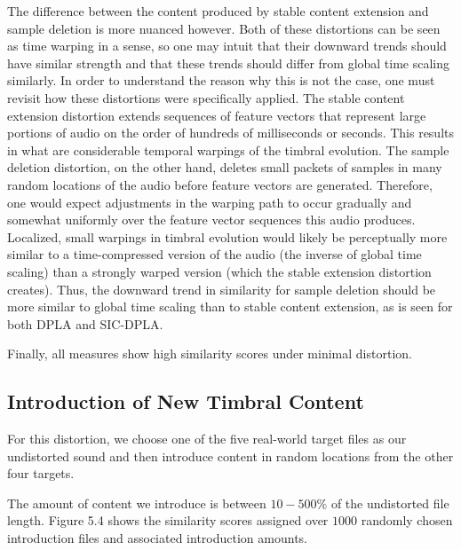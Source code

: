 \documentclass[a4paper,12pt]{report} 	%
\numberwithin{figure}{chapter}
\numberwithin{table}{chapter}
\numberwithin{equation}{chapter}
\begin{document}
\begin{flushleft}
The difference between the content produced by stable content extension and sample deletion is more nuanced however. Both of these distortions can be seen as time warping in a sense, so one may intuit that their downward trends should have similar strength and that these trends should differ from global time scaling similarly. In order to understand the reason why this is not the case, one must revisit how these distortions were specifically applied. The stable content extension distortion extends sequences of feature vectors that represent large portions of audio on the order of hundreds of milliseconds or seconds. This results in what are considerable temporal warpings of the timbral evolution. The sample deletion distortion, on the other hand, deletes small packets of samples in many random locations of the audio before feature vectors are generated. Therefore, one would expect adjustments in the warping path to occur gradually and somewhat uniformly over the feature vector sequences this audio produces. Localized, small warpings in timbral evolution would likely be perceptually more similar to a time-compressed version of the audio (the inverse of global time scaling) than a strongly warped version (which the stable extension distortion creates). Thus, the downward trend in similarity for sample deletion should be more similar to global time scaling than to stable content extension, as is seen for both DPLA and SIC-DPLA.

Finally, all measures show high similarity scores under minimal distortion.

\subsection{Introduction of New Timbral Content}
For this distortion, we choose one of the five real-world target files as our undistorted sound and then introduce content in random locations from the other four targets. 

The amount of content we introduce is between $10-500\%$ of the undistorted file length. Figure 5.4 shows the similarity scores assigned over $1000$ randomly chosen introduction files and associated introduction amounts.


\end{flushleft}
\end{document}
